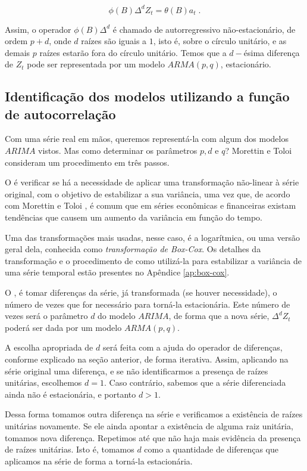 \begin{equation}\label{series:5.75}
\phi(B) \Delta^d Z_t = \theta(B) a_t\;.
\end{equation}

Assim, o operador $\phi(B) \Delta^d$ é chamado de autorregressivo não-estacionário, de ordem $p{+}d$, onde $d$ raízes são iguais a $1$, isto é, sobre o círculo unitário, e as demais $p$ raízes estarão fora do círculo unitário. Temos que a $d-$ésima diferença de $Z_t$ pode ser representada por um modelo $ARMA(p, q)$, estacionário. 

\subsection{Identificação dos modelos utilizando a função de autocorrelação}

Com uma série real em mãos, queremos representá-la com algum dos modelos $ARIMA$ vistos. Mas como determinar os parâmetros $p, d \text{ e } q$? Morettin e Toloi \citep{morettin} consideram um procedimento em três passos.

O  é verificar se há a necessidade de aplicar uma transformação não-linear à série original, com o objetivo de estabilizar a sua variância, uma vez que, de acordo com Morettin e Toloi \citep{morettin}, é comum que em séries econômicas e financeiras existam tendências que causem um aumento da variância em função do tempo.

Uma das transformações mais usadas, nesse caso, é a logarítmica, ou uma versão geral dela, conhecida como \emph{transformação de Box-Cox}. Os detalhes da transformação e o procedimento de como utilizá-la para estabilizar a variância de uma série temporal estão presentes no Apêndice \ref{ap:box-cox}.

O , é tomar diferenças da série, já transformada (se houver necessidade), o número de vezes que for necessário para torná-la estacionária. Este número de vezes será o parâmetro $d$ do modelo $ARIMA$, de forma que a nova série, $\Delta^d Z_t$ poderá ser dada por um modelo $ARMA(p, q)$.

A escolha apropriada de $d$ será feita com a ajuda do operador de diferenças, conforme explicado na seção anterior, de forma iterativa. Assim, aplicando na série original uma diferença, e se não identificarmos a presença de raízes unitárias, escolhemos $d = 1$. Caso contrário, sabemos que a série diferenciada ainda não é estacionária, e portanto $d > 1$.

Dessa forma tomamos outra diferença na série e verificamos a existência de raízes unitárias novamente. Se ele ainda apontar a existência de alguma raiz unitária, tomamos nova diferença. Repetimos até que não haja mais evidência da presença de raízes unitárias. Isto é, tomamos $d$ como a quantidade de diferenças que aplicamos na série de forma a torná-la estacionária.


